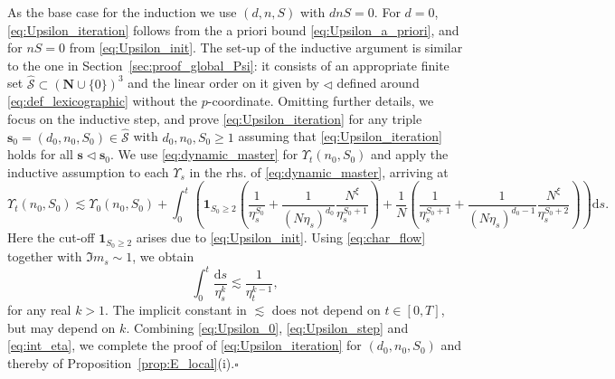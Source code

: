 \documentclass[10pt]{amsart}
\numberwithin{equation}{section}
\newcommand{\nc}{\normalcolor}
\newcommand{\dif}{\mathrm{d}}
\newcommand{\N}{\mathbf{N}}
\begin{document}
As the base case for the induction we use $(d,n,S)$ with $dnS=0$. For $d=0$, \eqref{eq:Upsilon_iteration} follows from the a priori bound \eqref{eq:Upsilon_a_priori}, and for $nS=0$ from \eqref{eq:Upsilon_init}. The set-up of the inductive argument is similar to the one in Section~\ref{sec:proof_global_Psi}: it consists of an appropriate finite set $\widehat{\mathscr{S}}\subset(\N\cup\{0\})^3$ and the linear order on it given by $\lhd$ defined around \eqref{eq:def_lexicographic} without the $p$-coordinate. Omitting further details, we focus on the inductive step, and prove \eqref{eq:Upsilon_iteration} for any triple $\bm{s}_0=(d_0,n_0,S_0)\in \widehat{\mathscr{S}}$ with $d_0,n_0,S_0\ge 1$ assuming that \eqref{eq:Upsilon_iteration} holds for all $\bm{s}\lhd \bm{s}_0$. We use \eqref{eq:dynamic_master} for $\Upsilon_t(n_0,S_0)$ and apply the inductive assumption to each $\Upsilon_s$ in the rhs. of \eqref{eq:dynamic_master}, arriving at
\begin{equation}
\Upsilon_t(n_0,S_0)\lesssim \Upsilon_0(n_0,S_0) +\int_0^t\!\!\left( \!\bm{1}_{S_0\ge 2}\!\left(\frac{1}{\eta_s^{S_0}} + \frac{1}{(N\eta_s)^{d_0}}\frac{N^\xi}{\eta_s^{S_0+1}}\right) + \frac{1}{N}\!\!\left(\frac{1}{\eta_s^{S_0+1}} + \frac{1}{(N\eta_s)^{d_0-1}} \frac{N^\xi}{\eta_s^{S_0+2}}\right)\!\!\right)\!\!\dif s.
\label{eq:Upsilon_step}
\end{equation}
Here the cut-off $\bm{1}_{S_0\ge 2}$ arises due to \eqref{eq:Upsilon_init}. Using \eqref{eq:char_flow} together with $\Im m_s\sim 1$, we obtain
\begin{equation}
\int_0^t \frac{\dif s}{\eta_s^k}\lesssim \frac{1}{\eta_t^{k-1}},
\label{eq:int_eta}
\end{equation}
for any real $k>1$. The implicit constant in $\lesssim$ does not depend on $t\in[0,T]$, but may depend on $k$. Combining \eqref{eq:Upsilon_0}, \eqref{eq:Upsilon_step} and \eqref{eq:int_eta}, we complete the proof of \eqref{eq:Upsilon_iteration} for $(d_0,n_0,S_0)$ and thereby of Proposition~\ref{prop:E_local}(i).\hfill $\square$ \nc
\end{document}
